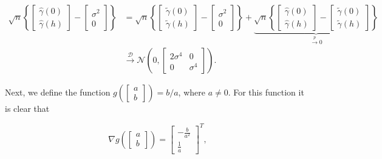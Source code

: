 \documentclass[]{book}
\theoremstyle{definition}
\theoremstyle{definition}
\theoremstyle{definition}
\theoremstyle{remark}
\begin{document}
{\[
\begin{aligned}
    \sqrt{n}\left\{
        \begin{bmatrix}
         \hat{\gamma} \left( 0 \right) \\
         \hat{\gamma} \left( h \right)
        \end{bmatrix}
    - \begin{bmatrix}
         \sigma^2 \\
         0
        \end{bmatrix} \right\}
    &= \sqrt{n}\left\{
        \begin{bmatrix}
         \tilde{\gamma} \left( 0 \right) \\
         \tilde{\gamma} \left( h \right)
        \end{bmatrix}
    - \begin{bmatrix}
         \sigma^2 \\
         0
        \end{bmatrix} \right\}
    + \underbrace{\sqrt{n}\left\{
        \begin{bmatrix}
         \hat{\gamma} \left( 0 \right) \\
         \hat{\gamma} \left( h \right)
        \end{bmatrix}
    - \begin{bmatrix}
         \tilde{\gamma} \left( 0 \right) \\
         \tilde{\gamma} \left( h \right)
        \end{bmatrix} \right\}}_{\overset{p}{\to} 0}\\
    &\overset{\mathcal{D}}{\to} 
    \mathcal{N}\left(0, \begin{bmatrix}
         2\sigma^4 & 0\\
         0 & \sigma^4
        \end{bmatrix} \right).
    \end{aligned}
\]

Next, we define the function
\(g\left( \begin{bmatrix}  a \\  b  \end{bmatrix} \right) = b/a\), where
\(a \neq 0\). For this function it is clear that

\[
\nabla g\left( \begin{bmatrix}
         a \\
         b
        \end{bmatrix} \right) = \begin{bmatrix}
         -\frac{b}{a^2} \\
         \frac{1}{a}
        \end{bmatrix}^{T} ,
\]

}
\end{document}

